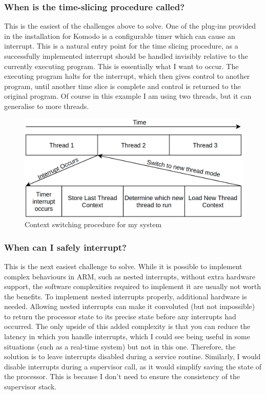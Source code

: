 \subsubsection{When is the time-slicing procedure called?}
This is the easiest of the challenges above to solve. One of the plug-ins provided in the installation for Komodo is a configurable timer which can cause an interrupt. This is a natural entry point for the time slicing procedure, as a successfully implemented interrupt should be handled invisibly relative to the currently executing program. This is essentially what I want to occur. The executing program halts for the interrupt, which then gives control to another program, until another time slice is complete and control is returned to the original program. Of course in this example I am using two threads, but it can generalise to more threads. 
\begin{figure}[ht!]
	\includegraphics[width=\linewidth]{figures/cswitch.png}
	\caption{Context switching procedure for my system}
	\label{fig:cswitch}
\end{figure} 
\subsubsection{When can I safely interrupt?}
This is the next easiest challenge to solve. While it is possible to implement complex behaviours in ARM, such as nested interrupts, without extra hardware support, the software complexities required to implement it are usually not worth the benefits. To implement nested interrupts properly, additional hardware is needed. Allowing nested interrupts can make it convoluted (but not impossible) to return the processor state to its precise state before any interrupts had occurred. The only upside of this added complexity is that you can reduce the latency in which you handle interrupts, which I could see being useful in some situations (such as a real-time system) but not in this one. Therefore, the solution is to leave interrupts disabled during a service routine. Similarly, I would disable interrupts during a supervisor call, as it would simplify saving the state of the processor. This is because I don't need to ensure the consistency of the supervisor stack.
